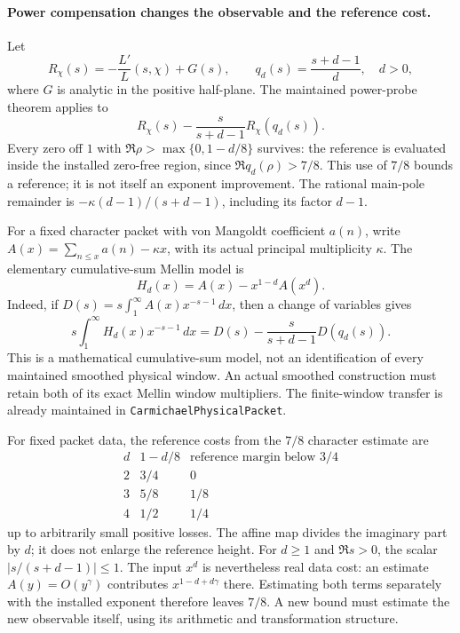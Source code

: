 \documentclass[11pt]{article}
\begin{document}
\paragraph{Power compensation changes the observable and the reference cost.}
Let
\[
 R_\chi(s)=-\frac{L'}{L}(s,\chi)+G(s),\qquad
 q_d(s)=\frac{s+d-1}{d},\quad d>0,
\]
where \(G\) is analytic in the positive half-plane. The maintained
power-probe theorem applies to
\[
 R_\chi(s)-\frac{s}{s+d-1}R_\chi(q_d(s)).
\]
Every zero off \(1\) with
\(\Re\rho>\max\{0,1-d/8\}\) survives: the reference is evaluated inside
the installed zero-free region, since
\(\Re q_d(\rho)>7/8\). This use of \(7/8\) bounds a reference;
it is not itself an exponent improvement.
The rational main-pole remainder is
\(-\kappa(d-1)/(s+d-1)\), including its factor \(d-1\).

For a fixed character packet with von Mangoldt coefficient \(a(n)\),
write \(A(x)=\sum_{n\le x}a(n)-\kappa x\), with its actual principal
multiplicity \(\kappa\). The elementary cumulative-sum Mellin model is
\[
 H_d(x)=A(x)-x^{1-d}A(x^d).
\]
Indeed, if \(D(s)=s\int_1^\infty A(x)x^{-s-1}\,dx\), then a change of
variables gives
\[
 s\int_1^\infty H_d(x)x^{-s-1}\,dx
 =D(s)-\frac{s}{s+d-1}D(q_d(s)).
\]
This is a mathematical cumulative-sum model, not an identification of
every maintained smoothed physical window. An actual smoothed
construction must retain both of its exact Mellin window multipliers.
The finite-window transfer is already maintained in
\texttt{CarmichaelPhysicalPacket}.

For fixed packet data, the reference costs from the \(7/8\) character
estimate are
\[
\begin{array}{c|c|c}
 d&1-d/8&\text{reference margin below }3/4\\ \hline
 2&3/4&0\\
 3&5/8&1/8\\
 4&1/2&1/4
\end{array}
\]
up to arbitrarily small positive losses. The affine map divides the
imaginary part by \(d\); it does not enlarge the reference height.
For \(d\ge1\) and \(\Re s>0\), the scalar
\(\lvert s/(s+d-1)\rvert\le1\).
The input \(x^d\) is nevertheless real data cost: an estimate
\(A(y)=O(y^\gamma)\) contributes \(x^{1-d+d\gamma}\) there.
Estimating both terms separately with the installed exponent therefore
leaves \(7/8\). A new bound must estimate the new observable itself,
using its arithmetic and transformation structure.
\end{document}
